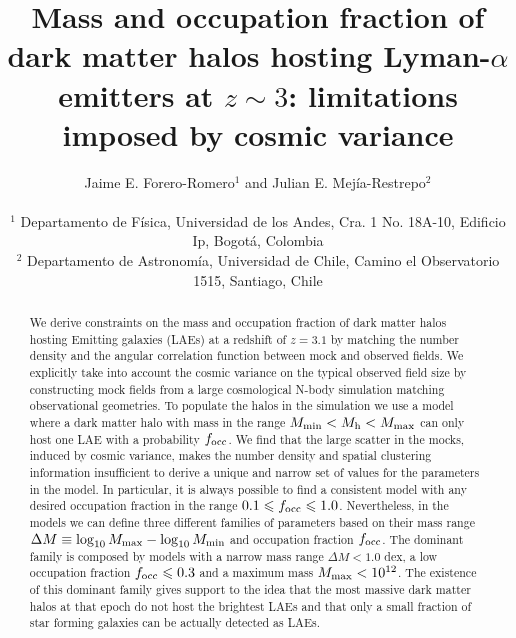 \documentclass[usenatbib]{mn2e}
\newcommand{\ly}{{\ifmmode{{\rm Ly}\alpha}\else{Ly$\alpha$~}\fi}}
\newcommand{\hMsun}{{\ifmmode{h^{-1}{\rm
        {M_{\odot}}}}\else{$h^{-1}{\rm{M_{\odot}}}$}\fi}}
\begin{document}
\title[Halo mass and occupation fraction for LAEs at
  $z=3.1$]{Mass and occupation
  fraction of dark matter halos hosting Lyman-$\alpha$ emitters
  at $z\sim 3$: limitations imposed by cosmic variance}    
\author[~J.~E. Forero-Romero and ~J.~E Mejia-Restreo]{
\parbox[t]{\textwidth}{\raggedright 
Jaime E. Forero-Romero$^{1}$ and
Julian E. Mej\'ia-Restrepo$^{2}$ 
}
\vspace*{6pt}\\
$^{1}$ Departamento de F\'{i}sica, Universidad de los Andes, Cra. 1
No. 18A-10, Edificio Ip, Bogot\'a, Colombia \\
$^{2}$ Departamento de Astronom\'{i}a, Universidad de Chile, Camino el
Observatorio 1515, Santiago, Chile} 

\maketitle

\begin{abstract}
%
We derive constraints on the mass and occupation fraction of dark
matter halos hosting \ly Emitting galaxies (LAEs) at a redshift of
$z=3.1$ by matching the number density and the angular
correlation function between mock and observed fields. We explicitly
take into account the cosmic variance on the typical observed field size by
constructing mock fields from a large cosmological N-body
simulation matching observational geometries. To populate the
halos in the simulation we use a model where a dark matter halo with
mass in the range $M_{\rm   min}<M_{\rm h}<M_{\rm max}$ can only host one LAE with a
probability $f_{\rm occ}$. We find that the large scatter in the mocks, induced by
cosmic variance, makes the number density and spatial clustering
information insufficient to derive a
unique and narrow set of values for the parameters in the model. In
particular, it is always possible to find a consistent model with any
desired occupation fraction in the range $0.1\leq f_{\rm occ}\leq
1.0$.  Nevertheless, in the models we can define three
different families of parameters based on their mass range $\Delta M
\equiv \log_{10}M_{\rm max} - \log_{10} M_{\rm min}$ and occupation
fraction $f_{\rm occ}$. The dominant family is composed by models with
a narrow mass range $\Delta M<1.0$ dex, a low occupation fraction
$f_{\rm occ}\leq 0.3$ and a maximum mass $M_{\rm  max}<
10^{12}$\hMsun.  The existence of this dominant family gives support
to the idea that the most massive dark matter halos at that epoch do
not host the brightest LAEs and that only a small fraction of star
forming galaxies can be actually detected as LAEs.   
 
\end{abstract}
\end{document}
